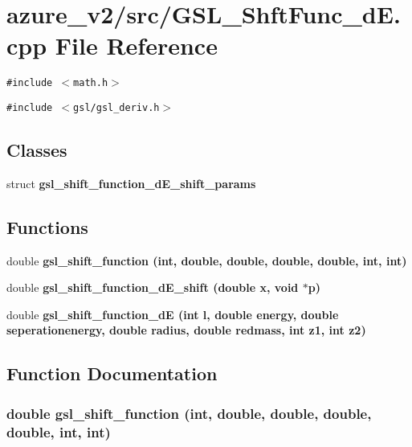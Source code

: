 \section{azure\_\-v2/src/GSL\_\-Shft\-Func\_\-d\-E.cpp File Reference}
\label{GSL__ShftFunc__dE_8cpp}
{\tt \#include $<$math.h$>$}\par
{\tt \#include $<$gsl/gsl\_\-deriv.h$>$}\par
\subsection*{Classes}
\begin{CompactItemize}
\item 
struct \bf{gsl\_\-shift\_\-function\_\-d\-E\_\-shift\_\-params}
\end{CompactItemize}
\subsection*{Functions}
\begin{CompactItemize}
\item 
double \bf{gsl\_\-shift\_\-function} (int, double, double, double, double, int, int)
\item 
double \bf{gsl\_\-shift\_\-function\_\-d\-E\_\-shift} (double x, void $\ast$p)
\item 
double \bf{gsl\_\-shift\_\-function\_\-d\-E} (int l, double energy, double seperationenergy, double radius, double redmass, int z1, int z2)
\end{CompactItemize}


\subsection{Function Documentation}
\subsubsection{\setlength{\rightskip}{0pt plus 5cm}double gsl\_\-shift\_\-function (int, double, double, double, double, int, int)}\label{GSL__ShftFunc__dE_8cpp_c0a20f296c0e528e465a6f4e5270e485}


